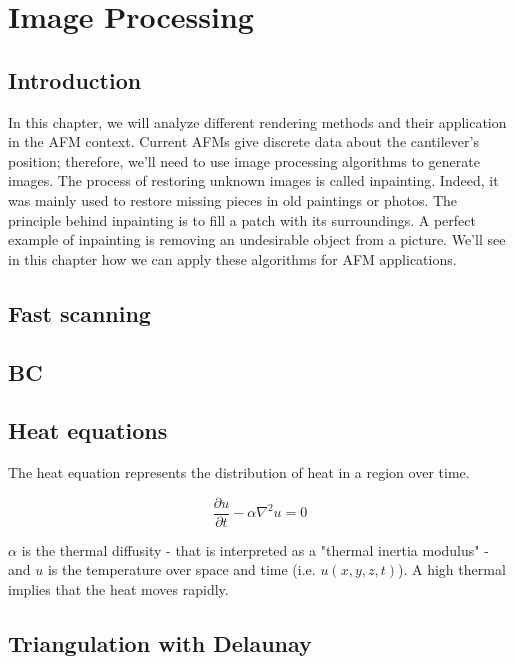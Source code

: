 \chapter{Image Processing}

\section{Introduction}

In this chapter, we will analyze different rendering methods and their application in the AFM context. Current AFMs give discrete data about the cantilever's position; therefore, we'll need to use image processing algorithms to generate images. The process of restoring unknown images is called inpainting. Indeed, it was mainly used to restore missing pieces in old paintings or photos. The principle behind inpainting is to fill a patch with its surroundings. A perfect example of inpainting is removing an undesirable object from a picture. We'll see in this chapter how we can apply these algorithms for AFM applications.

\section{Fast scanning}
\section{BC}

\section{Heat equations}

The heat equation represents the distribution of heat in a region over time.

\begin{equation}\label{eqn:heateq}
\frac{\partial u}{\partial t} - \alpha \nabla^2 u = 0
\end{equation}


$\alpha$ is the thermal diffusity - that is interpreted as a "thermal inertia modulus" - and $u$ is the temperature over space and time (i.e. $u(x,y,z,t)$). A high thermal implies that the heat moves rapidly.

\section{Triangulation with Delaunay}

